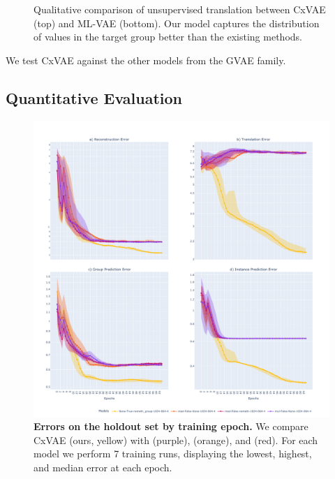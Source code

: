 \documentclass[nohyperref]{article}
\theoremstyle{plain}
\theoremstyle{definition}
\theoremstyle{remark}
\begin{document}
\begin{figure}[ht]
\begin{center}
    \caption{Qualitative comparison of unsupervised translation between CxVAE (top) and ML-VAE \citep{Bouchacourt2018MultiLevelVA} (bottom). Our model captures the distribution of values in the target group better than the existing methods.}
    \label{qualitative}
    \end{center}
    \vskip -0.2in
\end{figure}

We test CxVAE against the other models from the GVAE family.

\subsection{Quantitative Evaluation}

\begin{figure}[ht]
    \vskip 0.2in
    \begin{center}
    \centerline{\includegraphics[width=\columnwidth]{files/results.pdf}}
    \caption{\textbf{Errors on the holdout set by training epoch.} We compare CxVAE (ours, yellow) with \citet{Bouchacourt2018MultiLevelVA} (purple), \citet{Hosoya2019GroupbasedLO} (orange), and
    \citet{Nmeth2020AdversarialDW} (red). For each model we perform 7 training runs, displaying the lowest, highest, and median error at each epoch.}
    \label{results}
    \end{center}
    \vskip -0.2in
\end{figure}
\end{document}
